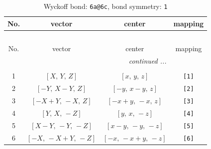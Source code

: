 \documentclass[fleqn,8pt]{jsarticle}
\begin{document}
\begin{longtable}{cccc}
\caption{Wyckoff bond: {\tt 6a@6c}, bond symmetry: {\tt 1}}
 \\
 \hline \hline
No. & vector & center & mapping \\ \hline \endfirsthead

\multicolumn{3}{l}{\tablename\ \thetable{}} \\
 \hline \hline
No. & vector & center & mapping \\ \hline \endhead

 \hline \hline
\multicolumn{3}{r}{\footnotesize\it continued ...} \\ \endfoot

 \hline \hline
\multicolumn{3}{r}{} \\ \endlastfoot

1 & $\left[ X,\, Y,\, Z \right]$ & $\left[ x,\, y,\, z \right]$ & {\tt [1]} \\ \hline
2 & $\left[ - Y,\, X - Y,\, Z \right]$ & $\left[ - y,\, x - y,\, z \right]$ & {\tt [2]} \\ \hline
3 & $\left[ - X + Y,\, - X,\, Z \right]$ & $\left[ - x + y,\, - x,\, z \right]$ & {\tt [3]} \\ \hline
4 & $\left[ Y,\, X,\, - Z \right]$ & $\left[ y,\, x,\, - z \right]$ & {\tt [4]} \\ \hline
5 & $\left[ X - Y,\, - Y,\, - Z \right]$ & $\left[ x - y,\, - y,\, - z \right]$ & {\tt [5]} \\ \hline
6 & $\left[ - X,\, - X + Y,\, - Z \right]$ & $\left[ - x,\, - x + y,\, - z \right]$ & {\tt [6]} \\
\end{longtable}
\end{document}
